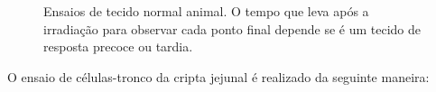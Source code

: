 \documentclass[11pt,a4paper]{article}
\begin{document}
	\begin{figure}[h]
		\centering
		\caption{Ensaios de tecido normal animal. O tempo que leva após a irradiação para observar cada ponto final depende se é um tecido de resposta precoce ou tardia.}
		\label{fig:ensaioInVido}
	\end{figure}

	O ensaio de células-tronco da cripta jejunal é realizado da seguinte maneira:
\end{document}
